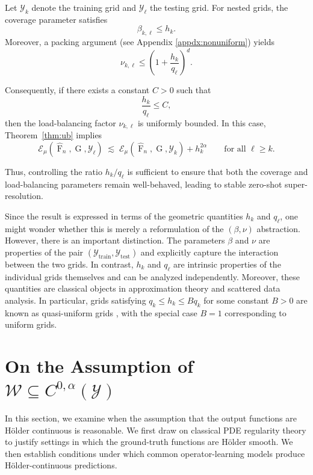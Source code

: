 \documentclass[11pt]{article}
\theoremstyle{plain}
\newcommand{\Ycal}{\mathcal{Y}}
\newcommand{\Wcal}{\mathcal{W}}
\begin{document}
Let $\Ycal_k$ denote the training grid and $\Ycal_\ell$ the testing grid. For nested grids, the coverage parameter satisfies
\[
\beta_{k,\ell} \le h_k.
\]
Moreover, a packing argument (see Appendix \ref{appdx:nonuniform}) yields
\[
\nu_{k,\ell}
\le
\left(1+\frac{h_k}{q_\ell}\right)^d.
\]

Consequently, if there exists a constant $C > 0$ such that
\[
\frac{h_k}{q_\ell} \le C,
\]
then the load-balancing factor $\nu_{k,\ell}$ is uniformly bounded. In this case, Theorem~\ref{thm:ub} implies
\[
\mathcal{E}_\mu(\widehat{\operatorname{F}}_n, \operatorname{G}, \Ycal_\ell)
\;\lesssim\;
\mathcal{E}_\mu(\widehat{\operatorname{F}}_n, \operatorname{G}, \Ycal_k)
+
h_k^{2\alpha}
\qquad \text{for all } \ell \ge k.
\]

Thus, controlling the ratio $h_k/q_\ell$ is sufficient to ensure that both the coverage and load-balancing parameters remain well-behaved, leading to stable zero-shot super-resolution.


Since the result is expressed in terms of the geometric quantities $h_k$ and $q_\ell$, one might wonder whether this is merely a reformulation of the $(\beta, \nu)$ abstraction. However, there is an important distinction. The parameters $\beta$ and $\nu$ are properties of the pair $(\Ycal_{\text{train}}, \Ycal_{\text{test}})$ and explicitly capture the interaction between the two grids. In contrast, $h_k$ and $q_\ell$ are intrinsic properties of the individual grids themselves and can be analyzed independently. Moreover, these quantities are classical objects in approximation theory and scattered data analysis. In particular, grids satisfying $
q_k \le h_k \le B q_k$
for some constant $B > 0$ are known as quasi-uniform grids \citep[Chapter4]{wendland2004scattered}, with the special case $B = 1$ corresponding to uniform grids.





\section{On the Assumption of $\Wcal \subseteq C^{0, \alpha}(\Ycal)$}
In this section, we examine when the assumption that the output functions are H{\" o}lder continuous is
reasonable. We first draw on classical PDE regularity theory to justify settings in which the
ground-truth functions are H{\" o}lder smooth. We then establish conditions under which common
operator-learning models produce H{\" o}lder-continuous predictions.
\end{document}
